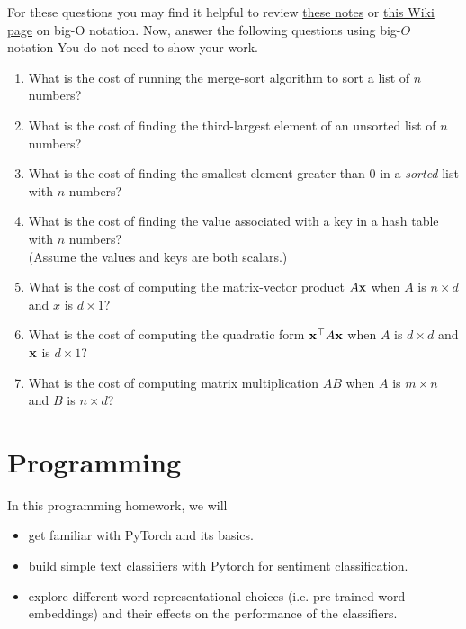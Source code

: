 For these questions you may find it helpful to review \href{http://www.cs.ubc.ca/~schmidtm/Courses/Notes/bigO.pdf}{these notes} or \href{https://en.wikipedia.org/wiki/Big_O_notation}{this Wiki page} on big-O notation. 
Now, answer the following questions using big-$O$ notation You do not need to show your work.
\begin{enumerate}
    \item What is the cost of running the merge-sort algorithm to sort  a list of $n$ numbers?
    \solution{}
    
    \item What is the cost of finding the third-largest element of an unsorted list of $n$ numbers?
    \solution{}
    
    \item What is the cost of finding the smallest element greater than 0 in a \emph{sorted} list with $n$ numbers?
    \solution{}
    
    \item What is the cost of finding the value associated with a key in a hash table with $n$ numbers? \\(Assume the values and keys are both scalars.)
    \solution{}
    
    \item What is the cost of computing the matrix-vector product $A\mathbf{x}$ when $A$ is $n \times d$ and $x$ is $d \times 1$?
    \solution{}
    
    \item What is the cost of computing the quadratic form $\mathbf{x}^\top A\mathbf{x}$ when $A$ is $d \times d$ and $\mathbf{x}$ is $d \times 1$?
    \solution{}

    \item What is the cost of computing matrix multiplication $AB$ when $A$ is $m \times n$ and $B$ is $n \times d$? 
    \solution{}

\end{enumerate}

\newpage
\section{Programming}
In this programming homework, we will
\begin{itemize}
    \item get familiar with PyTorch and its basics.
    \item build simple text classifiers with Pytorch for sentiment classification.
    \item explore different word representational choices (i.e. pre-trained word embeddings) and their effects on the performance of the classifiers.
\end{itemize}

